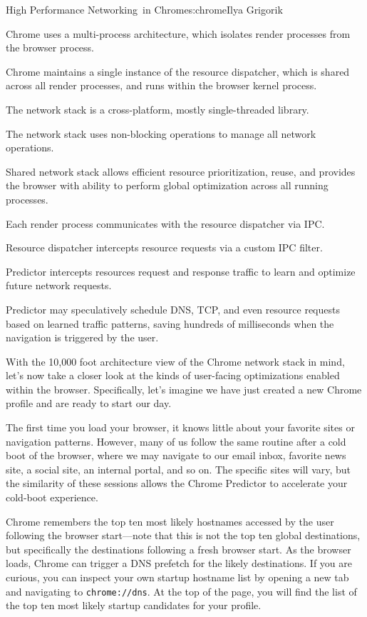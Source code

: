\begin{aosachapter}{High Performance Networking~in Chrome}{s:chrome}{Ilya Grigorik}
\begin{aosaitemize}
\item
  Chrome uses a multi-process architecture, which isolates render
  processes from the browser process.
\item
  Chrome maintains a single instance of the resource dispatcher, which
  is shared across all render processes, and runs within the browser
  kernel process.
\item
  The network stack is a cross-platform, mostly single-threaded library.
\item
  The network stack uses non-blocking operations to manage all network
  operations.
\item
  Shared network stack allows efficient resource prioritization, reuse,
  and provides the browser with ability to perform global optimization
  across all running processes.
\item
  Each render process communicates with the resource dispatcher via IPC.
\item
  Resource dispatcher intercepts resource requests via a custom IPC
  filter.
\item
  Predictor intercepts resources request and response traffic to learn
  and optimize future network requests.
\item
  Predictor may speculatively schedule DNS, TCP, and even resource
  requests based on learned traffic patterns, saving hundreds of
  milliseconds when the navigation is triggered by the user.
\end{aosaitemize}


With the 10,000 foot architecture view of the Chrome network stack in
mind, let's now take a closer look at the kinds of user-facing
optimizations enabled within the browser. Specifically, let's imagine we
have just created a new Chrome profile and are ready to start our day.


The first time you load your browser, it knows little about your
favorite sites or navigation patterns. However, many of us follow the
same routine after a cold boot of the browser, where we may navigate to
our email inbox, favorite news site, a social site, an internal portal,
and so on. The specific sites will vary, but the similarity of these
sessions allows the Chrome Predictor to accelerate your cold-boot
experience.

Chrome remembers the top ten most likely hostnames accessed by the user
following the browser start---note that this is not the top ten global
destinations, but specifically the destinations following a fresh
browser start. As the browser loads, Chrome can trigger a DNS prefetch
for the likely destinations. If you are curious, you can inspect your
own startup hostname list by opening a new tab and navigating to
\texttt{chrome://dns}. At the top of the page, you will find the list of
the top ten most likely startup candidates for your profile.


\end{aosachapter}
